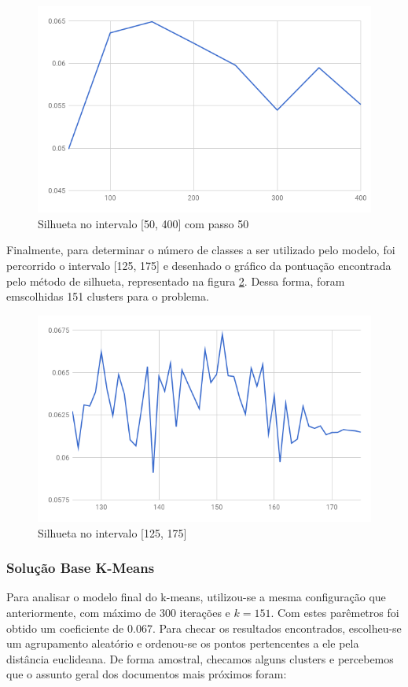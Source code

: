 \documentclass[conference]{IEEEtran}
\begin{document}
\begin{figure}[H]
  \includegraphics[scale=0.4, center]{silhouette1.png}
  \caption{Silhueta no intervalo [50, 400] com passo 50}
  \label{fig:sil1}
\end{figure}

Finalmente, para determinar o número de classes a ser utilizado pelo modelo, foi percorrido o intervalo [125, 175] e desenhado o gráfico da pontuação encontrada pelo método de silhueta, representado na figura \ref{fig:sil2}. Dessa forma, foram emscolhidas 151 clusters para o problema. 

\begin{figure}[H]
  \includegraphics[scale=0.4, center]{silhouette2.png}
  \caption{Silhueta no intervalo [125, 175]}
  \label{fig:sil2}
\end{figure}

\subsubsection{Solução Base K-Means}
Para analisar o modelo final do k-means, utilizou-se a mesma configuração que anteriormente, com máximo de 300 iterações e $k=151$. Com estes parêmetros foi obtido um coeficiente de 0.067. Para checar os resultados encontrados, escolheu-se um agrupamento aleatório e ordenou-se os pontos pertencentes a ele pela distância euclideana. De forma amostral, checamos alguns clusters e percebemos que o assunto geral dos documentos mais próximos foram:
\end{document}
